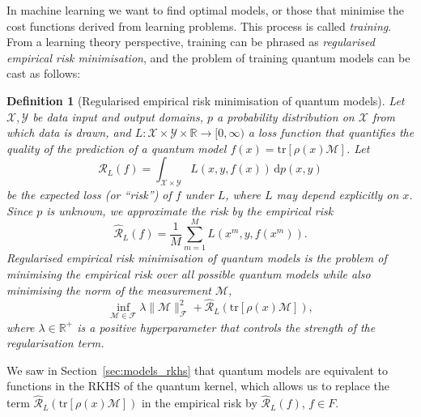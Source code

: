 \documentclass[aps, reprint, onecolumn, nofootinbib, longbibliography]{revtex4-2}
\newtheorem{definition}{Definition}[]
\newcommand{\tr}[1]{ \mathrm{tr}\left[#1\right] }
\newcommand{\meas}{\mathcal{M}}
\begin{document}
In machine learning we want to find optimal models, or those that minimise the cost functions derived from learning problems. This process is called \textit{training}. From a learning theory perspective, training can be phrased as \textit{regularised empirical risk minimisation}, and the problem of training quantum models can be cast as follows:

\begin{definition}[Regularised empirical risk minimisation of quantum models]
Let $\mathcal{X}, \mathcal{Y}$ be data input and output domains, $p$ a probability distribution on $\mathcal{X}$ from which data is drawn, and $L: \mathcal{X} \times \mathcal{Y} \times \mathbb{R} \rightarrow [0, \infty) $ a loss function that quantifies the quality of the prediction of a quantum model $f(x)= \tr{\rho(x) \meas}$. Let 
\begin{equation}
\mathcal{R}_L(f) = \int_{\mathcal{X} \times \mathcal{Y}} L(x, y, f(x)) \,\mathrm{d}p(x, y) 
\end{equation}
be the expected loss (or ``\textit{risk}'') of $f$ under $L$, where $L$ may depend explicitly on $x$. Since $p$ is unknown, we approximate the risk by the empirical risk  
\begin{equation}\hat{\mathcal{R}}_L(f) = \frac{1}{M} \sum_{m=1}^M L(x^m, y, f(x^m)).\end{equation}
Regularised empirical risk minimisation of quantum models is the problem of minimising the empirical risk over all possible quantum models while also minimising the norm of the measurement $\meas$, 
\begin{equation}\label{eq:erm}
    \inf_{\meas \in \mathcal{F}} \lambda \| \meas \|^2_{\mathcal{F}} + \hat{\mathcal{R}}_L(\tr{\rho(x) \meas}),
\end{equation}
where $\lambda \in \mathbb{R}^+$ is a positive hyperparameter that controls the strength of the regularisation term.
\end{definition}

We saw in Section~\ref{sec:models_rkhs} that quantum models are equivalent to functions in the RKHS of the quantum kernel, which allows us to replace the term $\hat{\mathcal{R}}_L(\tr{ \rho(x) \meas})$ in the empirical risk by $\hat{\mathcal{R}}_L(f)$, $f \in F$.
\end{document}
